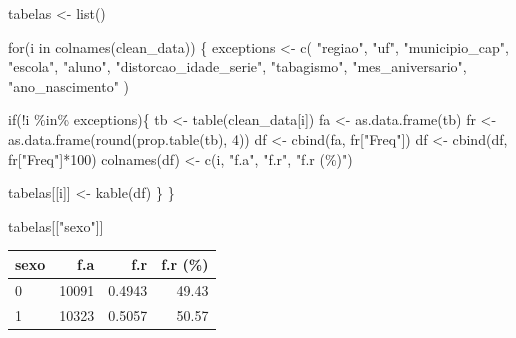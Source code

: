 \documentclass[
]{article}
\newenvironment{Shaded}{\begin{snugshade}}{\end{snugshade}}
\newcommand{\ControlFlowTok}[1]{\textcolor[rgb]{0.00,0.23,0.31}{#1}}
\newcommand{\DecValTok}[1]{\textcolor[rgb]{0.68,0.00,0.00}{#1}}
\newcommand{\FunctionTok}[1]{\textcolor[rgb]{0.28,0.35,0.67}{#1}}
\newcommand{\NormalTok}[1]{\textcolor[rgb]{0.00,0.23,0.31}{#1}}
\newcommand{\OtherTok}[1]{\textcolor[rgb]{0.00,0.23,0.31}{#1}}
\newcommand{\SpecialCharTok}[1]{\textcolor[rgb]{0.37,0.37,0.37}{#1}}
\newcommand{\StringTok}[1]{\textcolor[rgb]{0.13,0.47,0.30}{#1}}
\begin{document}
\begin{Shaded}
\begin{Highlighting}[]
\NormalTok{tabelas }\OtherTok{\textless{}{-}} \FunctionTok{list}\NormalTok{()}

\ControlFlowTok{for}\NormalTok{(i }\ControlFlowTok{in} \FunctionTok{colnames}\NormalTok{(clean\_data)) \{}
\NormalTok{  exceptions }\OtherTok{\textless{}{-}} \FunctionTok{c}\NormalTok{(}
    \StringTok{"regiao"}\NormalTok{,}
    \StringTok{"uf"}\NormalTok{,}
    \StringTok{"municipio\_cap"}\NormalTok{,}
    \StringTok{"escola"}\NormalTok{,}
    \StringTok{"aluno"}\NormalTok{,}
    \StringTok{"distorcao\_idade\_serie"}\NormalTok{,}
    \StringTok{"tabagismo"}\NormalTok{,}
    \StringTok{"mes\_aniversario"}\NormalTok{,}
    \StringTok{"ano\_nascimento"}
\NormalTok{  )}
  
  \ControlFlowTok{if}\NormalTok{(}\SpecialCharTok{!}\NormalTok{i }\SpecialCharTok{\%in\%}\NormalTok{ exceptions)\{}
\NormalTok{    tb }\OtherTok{\textless{}{-}} \FunctionTok{table}\NormalTok{(clean\_data[i])}
\NormalTok{    fa }\OtherTok{\textless{}{-}} \FunctionTok{as.data.frame}\NormalTok{(tb)}
\NormalTok{    fr }\OtherTok{\textless{}{-}} \FunctionTok{as.data.frame}\NormalTok{(}\FunctionTok{round}\NormalTok{(}\FunctionTok{prop.table}\NormalTok{(tb), }\DecValTok{4}\NormalTok{))}
\NormalTok{    df }\OtherTok{\textless{}{-}} \FunctionTok{cbind}\NormalTok{(fa, fr[}\StringTok{"Freq"}\NormalTok{])}
\NormalTok{    df }\OtherTok{\textless{}{-}} \FunctionTok{cbind}\NormalTok{(df, fr[}\StringTok{"Freq"}\NormalTok{]}\SpecialCharTok{*}\DecValTok{100}\NormalTok{)}
    \FunctionTok{colnames}\NormalTok{(df) }\OtherTok{\textless{}{-}} \FunctionTok{c}\NormalTok{(i, }\StringTok{"f.a"}\NormalTok{, }\StringTok{"f.r"}\NormalTok{, }\StringTok{"f.r (\%)"}\NormalTok{)}

\NormalTok{    tabelas[[i]] }\OtherTok{\textless{}{-}} \FunctionTok{kable}\NormalTok{(df)}
\NormalTok{  \}}
\NormalTok{\}}
\end{Highlighting}
\end{Shaded}

\begin{Shaded}
\begin{Highlighting}[]
\NormalTok{tabelas[[}\StringTok{"sexo"}\NormalTok{]]}
\end{Highlighting}
\end{Shaded}

\begin{longtable}[]{@{}lrrr@{}}
\toprule()
sexo & f.a & f.r & f.r (\%) \\
\midrule()
\endhead
0 & 10091 & 0.4943 & 49.43 \\
1 & 10323 & 0.5057 & 50.57 \\
\bottomrule()
\end{longtable}
\end{document}
